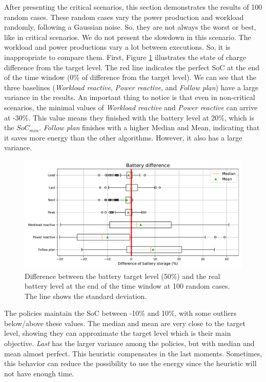 After presenting the critical scenarios, this section demonstrates the results of 100 random cases. These random cases vary the power production and workload randomly, following a Gaussian noise. So, they are not always the worst or best, like in critical scenarios. We do not present the slowdown in this scenario. The workload and power productions vary a lot between executions. So, it is inappropriate to compare them. First, Figure \ref{fig:SoC_diff} illustrates the state of charge difference from the target level. The red line indicates the perfect SoC at the end of the time window (0\% of difference from the target level). We can see that the three baselines (\emph{Workload reactive}, \emph{Power reactive}, and \emph{Follow plan}) have a large variance in the results. An important thing to notice is that even in non-critical scenarios, the minimal values of \emph{Workload reactive} and \emph{Power reactive} can arrive at -30\%. This value means they finished with the battery level at 20\%, which is the $SoC_{min}$. \emph{Follow plan} finishes with a higher Median and Mean, indicating that it saves more energy than the other algorithms. However, it also has a large variance.

\begin{figure}[!htb]
    \centering
    \includegraphics[scale=0.55]{Images/Compensations/battery_diff.pdf}
    \caption{Difference between the battery target level (50\%) and the real battery level at the end of the time window at 100 random cases. The line shows the standard deviation.}
    \label{fig:SoC_diff}
\end{figure}

The policies maintain the SoC between -10\% and 10\%, with some outliers below/above these values. The median and mean are very close to the target level, showing they can approximate the target level which is their main objective. \emph{Last} has the larger variance among the policies, but with median and mean almost perfect. This heuristic compensates in the last moments. Sometimes, this behavior can reduce the possibility to use the energy since the heuristic will not have enough time. 

